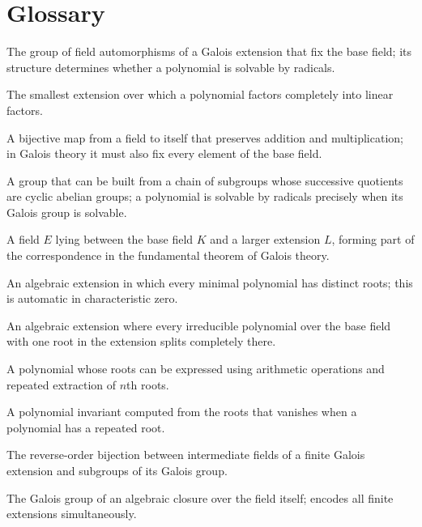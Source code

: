 \section*{Glossary}
\begin{description}[leftmargin=*,style=nextline,itemsep=0.3em]
\item[\textbf{Galois group.}] The group of field automorphisms of a Galois extension that fix the base field; its structure determines whether a polynomial is solvable by radicals.
\item[\textbf{Splitting field.}] The smallest extension over which a polynomial factors completely into linear factors.
\item[\textbf{Automorphism.}] A bijective map from a field to itself that preserves addition and multiplication; in Galois theory it must also fix every element of the base field.
\item[\textbf{Solvable group.}] A group that can be built from a chain of subgroups whose successive quotients are cyclic abelian groups; a polynomial is solvable by radicals precisely when its Galois group is solvable.
\item[\textbf{Intermediate field.}] A field $E$ lying between the base field $K$ and a larger extension $L$, forming part of the correspondence in the fundamental theorem of Galois theory.
\item[\textbf{Separable extension.}] An algebraic extension in which every minimal polynomial has distinct roots; this is automatic in characteristic zero.
\item[\textbf{Normal extension.}] An algebraic extension where every irreducible polynomial over the base field with one root in the extension splits completely there.
\item[\textbf{Solvable by radicals.}] A polynomial whose roots can be expressed using arithmetic operations and repeated extraction of $n$th roots.
\item[\textbf{Discriminant.}] A polynomial invariant computed from the roots that vanishes when a polynomial has a repeated root.
\item[\textbf{Galois correspondence.}] The reverse-order bijection between intermediate fields of a finite Galois extension and subgroups of its Galois group.
\item[\textbf{Absolute Galois group.}] The Galois group of an algebraic closure over the field itself; encodes all finite extensions simultaneously.
\end{description}
